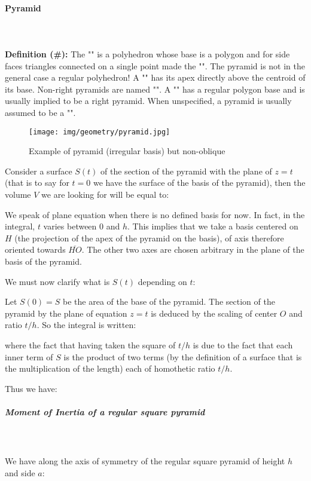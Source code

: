 {	\paragraph{Pyramid}\mbox{}\\\\
	\textbf{Definition (\#\mydef):} The "" is a polyhedron whose base is a polygon and for side faces triangles connected on a single point made the "". The pyramid is not in the general case a regular polyhedron! A "" has its apex directly above the centroid of its base. Non-right pyramids are named "". A "" has a regular polygon base and is usually implied to be a right pyramid. When unspecified, a pyramid is usually assumed to be a "".
	\begin{figure}[H]
		\centering
		\texttt{[image: img/geometry/pyramid.jpg]}
		\caption{Example of pyramid (irregular basis) but non-oblique}
	\end{figure}
	Consider a surface $S(t)$ of the section of the pyramid with the plane of $z=t$ (that is to say for $t=0$ we have the surface of the basis of the pyramid), then the volume $V$ we are looking for will be equal to:
	
	We speak of plane equation when there is no defined basis for now. In fact, in the integral, $t$ varies between $0$ and $h$. This implies that we take a basis centered on $H$ (the projection of the apex of the pyramid on the basis), of axis therefore oriented towards $\overline{HO}$. The other two axes are chosen arbitrary in the plane of the basis of the pyramid.
	
	We must now clarify what is $S(t)$ depending on $t$:
	
	Let $S(0)=S$ be the area of the base of the pyramid. The section of the pyramid by the plane of equation $z=t$ is deduced by the scaling of center $O$ and ratio $t/h$. So the integral is written:
	
	where the fact that having taken the square of $t/h$ is due to the fact that each inner term of $S$ is the product of two terms (by the definition of a surface that is the multiplication of the length) each of homothetic ratio $t / h$.
	
	Thus we have:
	
	
	\subparagraph{Moment of Inertia of a regular square pyramid}\mbox{}\\\\
	We have along the axis of symmetry of the regular square pyramid of height $h$ and side $a$:
	
}
